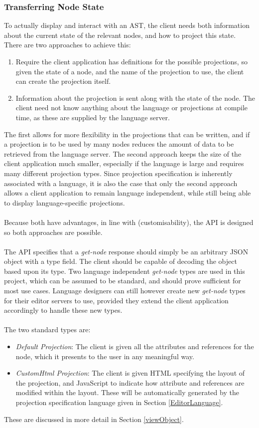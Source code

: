 \documentclass{article}
\begin{document}
{\subsubsection{Transferring Node State}\label{apiNodeStateTransfer}
To actually display and interact with an AST, the client needs both information about the current state of the relevant nodes, and how to project this state. There are two approaches to achieve this:
\begin{enumerate}
\item Require the client application has definitions for the possible projections, so given the state of a node, and the name of the projection to use, the client can create the projection itself.
\item Information about the projection is sent along with the state of the node. The client need not know anything about the language or projections at compile time, as these are supplied by the language server.
\end{enumerate}
The first allows for more flexibility in the projections that can be written, and if a projection is to be used by many nodes reduces the amount of data to be retrieved from the language server. The second approach keeps the size of the client application much smaller, especially if the language is large and requires many different projection types. Since projection specification is inherently associated with a language, it is also the case that only the second approach allows a client application to remain language independent, while still being able to display language-specific projections.
\\
\\
Because both have advantages, in line with \RCustom (customisability), the API is designed so both approaches are possible.
\\
\\
The API specifies that a \emph{get-node} response should simply be an arbitrary JSON~\cite{json} object with a type field. The client should be capable of decoding the object based upon its type. Two language independent \emph{get-node} types are used in this project, which can be assumed to be standard, and should prove sufficient for most use cases. Language designers can still however create new \emph{get-node} types for their editor servers to use, provided they extend the client application accordingly to handle these new types. 
\\
\\
The two standard types are:
\begin{itemize}
\item \emph{Default Projection}: The client is given all the attributes and references for the node, which it presents to the user in any meaningful way.
\item \emph{CustomHtml Projection}: The client is given HTML specifying the layout of the projection, and JavaScript to indicate how attribute and references are modified within the layout. These will be automatically generated by the projection specification language given in Section \ref{EditorLanguage}.
\end{itemize}
These are discussed in more detail in Section \ref{viewObject}.
}
\end{document}
